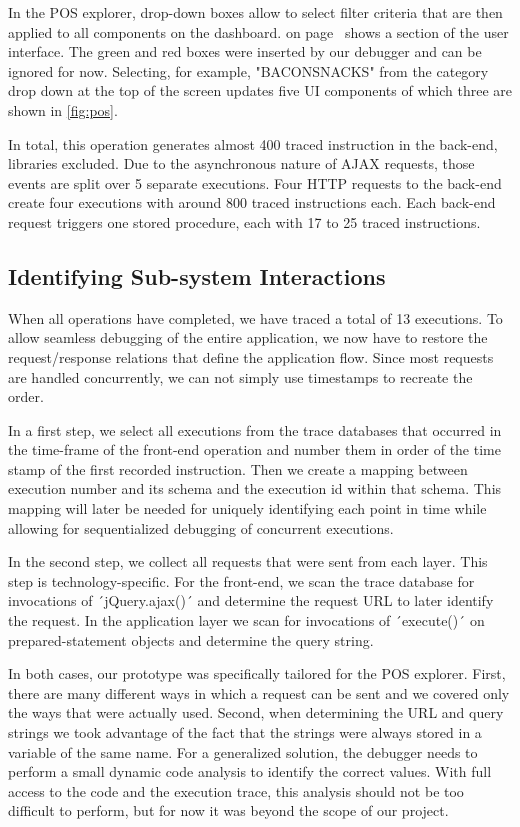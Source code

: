 \documentclass[
      english,
			conference,
      ]{IEEEtran}
\begin{document}
In the POS explorer, drop-down boxes allow to select filter criteria that are then applied to all components on the dashboard.
 on page~\pageref{fig:pos} shows a section of the user interface.
The green and red boxes were inserted by our debugger and can be ignored for now.
Selecting, for example, "BACONSNACKS" from the category drop down at the top of the screen updates five UI components of which three are shown in \cref{fig:pos}.

In total, this operation generates almost 400 traced instruction in the back-end, libraries excluded.
Due to the asynchronous nature of AJAX requests, those events are split over 5 separate executions.
Four HTTP requests to the back-end create four executions with around 800 traced instructions each.
Each back-end request triggers one stored procedure, each with 17 to 25 traced instructions.

\subsection{Identifying Sub-system Interactions}

When all operations have completed, we have traced a total of 13 executions.
To allow seamless debugging of the entire application, we now have to restore the request/response relations that define the application flow.
Since most requests are handled concurrently, we can not simply use timestamps to recreate the order.

In a first step, we select all executions from the trace databases that occurred in the time-frame of the front-end operation and number them in order of the time stamp of the first recorded instruction.
Then we create a mapping between execution number and its schema and the execution id within that schema.
This mapping will later be needed for uniquely identifying each point in time while allowing for sequentialized debugging of concurrent executions.

In the second step, we collect all requests that were sent from each layer.
This step is technology-specific.
For the front-end, we scan the trace database for invocations of ´jQuery.ajax()´ and determine the request URL to later identify the request.
In the application layer we scan for invocations of ´execute()´ on prepared-statement objects and determine the query string.

In both cases, our prototype was specifically tailored for the POS explorer.
First, there are many different ways in which a request can be sent and we covered only the ways that were actually used.
Second, when determining the URL and query strings we took advantage of the fact that the strings were always stored in a variable of the same name.
For a generalized solution, the debugger needs to perform a small dynamic code analysis to identify the correct values.
With full access to the code and the execution trace, this analysis should not be too difficult to perform, but for now it was beyond the scope of our project.
\end{document}
